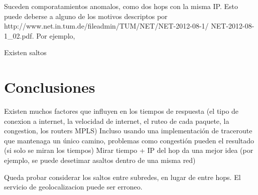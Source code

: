 Suceden comporatamientos anomalos, como dos hops con la misma IP. Esto puede deberse a alguno de los motivos descriptos por http://www.net.in.tum.de/fileadmin/TUM/NET/NET-2012-08-1/
NET-2012-08-1\_02.pdf. Por ejemplo, 

Existen saltos 


\section{Conclusiones}

	Existen muchos factores que influyen en los tiempos de respuesta (el tipo de conexion a internet, la velocidad de internet, el ruteo de cada paquete, la congestion, los routers MPLS)
	Incluso usando una implementación de traceroute que mantenaga un único camino, problemas como congestión pueden el resultado (si solo se miran los tiempos)
	Mirar tiempo + IP del hop da una mejor idea (por ejemplo, se puede desetimar asaltos dentro de una misma red)

	Queda probar considerar los saltos entre subredes, en lugar de entre hops.
	El servicio de geolocalizacion puede ser erroneo.
	
